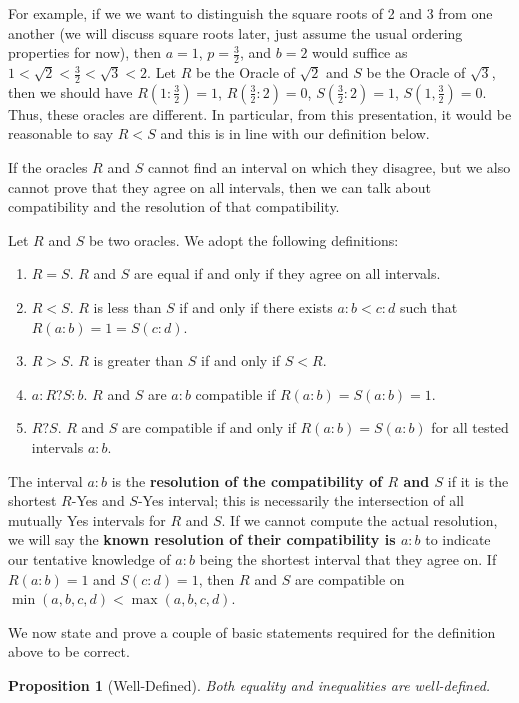 \documentclass[12pt]{article}
\newtheorem{proposition}{Proposition}
\theoremstyle{remark}
\begin{document}
For example, if we we want to distinguish the square roots of 2 and 3 from one another (we will discuss square roots later, just assume the usual ordering properties for now), then $a = 1$, $p = \tfrac{3}{2}$, and $b = 2$ would suffice as $1 < \sqrt{2} < \tfrac{3}{2} < \sqrt{3} < 2$. Let $R$ be the Oracle of $\sqrt{2}$ and $S$ be the Oracle of $\sqrt{3}$, then we should have $R(1:\tfrac{3}{2}) = 1$, $R(\tfrac{3}{2}:2) = 0$,  $S(\tfrac{3}{2}:2) = 1$, $S(1, \tfrac{3}{2}) = 0$. Thus, these oracles are different. In particular, from this presentation, it would be reasonable to say $R < S$ and this is in line with our definition below.

If the oracles $R$ and $S$ cannot find an interval on which they disagree, but we also cannot prove that they agree on all intervals, then we can talk about compatibility and the resolution of that compatibility.

Let $R$ and $S$ be two oracles. We adopt the following definitions:

\begin{enumerate}
    \item $R=S$. $R$ and $S$ are equal if and only if they agree on all intervals. 
    \item $R < S$. $R$ is less than $S$ if and only if there exists $a:b < c:d$ such that $R(a:b) =1 = S(c:d)$. 
    \item $R > S$. $R$ is greater than $S$ if and only if $S < R$.
    \item $a:R?S:b$. $R$ and $S$ are $a:b$ compatible if $R(a:b)=S(a:b) = 1$.
    \item $R ? S$. $R$ and $S$ are compatible if and only if $R(a:b) = S(a:b)$ for all tested intervals $a:b$. 
\end{enumerate}

The interval $a:b$ is the \textbf{resolution of the compatibility of $R$ and $S$} if it is the shortest $R$-Yes and $S$-Yes interval; this is necessarily the intersection of all mutually Yes intervals for $R$ and $S$. If we cannot compute the actual resolution, we will say the \textbf{known resolution of their compatibility is $a:b$} to indicate our tentative knowledge of $a:b$ being the shortest interval that they agree on. If $R(a:b) = 1$ and $S(c:d) = 1$, then $R$ and $S$ are compatible on $\min(a,b,c,d)<\max(a,b,c,d)$. 

We now state and prove a couple of basic statements required for the definition above to be correct. 

\begin{proposition}[Well-Defined]\label{pr:wd}
Both equality and inequalities are well-defined. 
\end{proposition}
\end{document}
